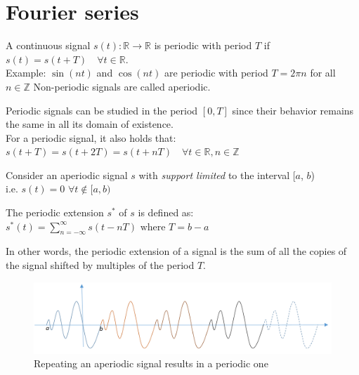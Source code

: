 \section{Fourier series}

\begin{definition}
   
   A continuous signal $s(t): \mathbb{R} \rightarrow \mathbb{R}$ is periodic with period $T$ if
   $s(t) = s(t + T) \quad \forall t \in \mathbb{R}$.\\
   Example: $\sin(nt)$ and $\cos(nt)$ are periodic with period $T = 2\pi n$ for all $n \in \mathbb{Z}$
   Non-periodic signals are called aperiodic.

   Periodic signals can be studied in the period $[0, T]$ since their behavior remains the same in all its domain of existence.\\
   For a periodic signal, it also holds that:
   $s(t + T) = s(t + 2T) = s(t + nT) \quad \forall t \in \mathbb{R}, n \in \mathbb{Z}$
\end{definition}

\begin{definition}
   
   Consider an aperiodic signal $s$ with \textit{support limited} to the interval [$a$, $b$)\\
   i.e. $s(t) = 0$ $\forall t \notin [a, b)$
   
   The periodic extension $s^*$ of $s$ is defined as:
   $s^*(t) = \sum_{n=-\infty}^{\infty} s(t - nT) \text{ where } T = b - a$
   
\end{definition}

In other words, the periodic extension of a signal is the sum of all the copies of the signal shifted by multiples of the period $T$.

\begin{figure}[htbp]
   \centering
   \includegraphics{images/signals_aperiodic.png}
   \caption{Repeating an aperiodic signal results in a periodic one}
   \label{fig:signals_aperiodic}
\end{figure}


